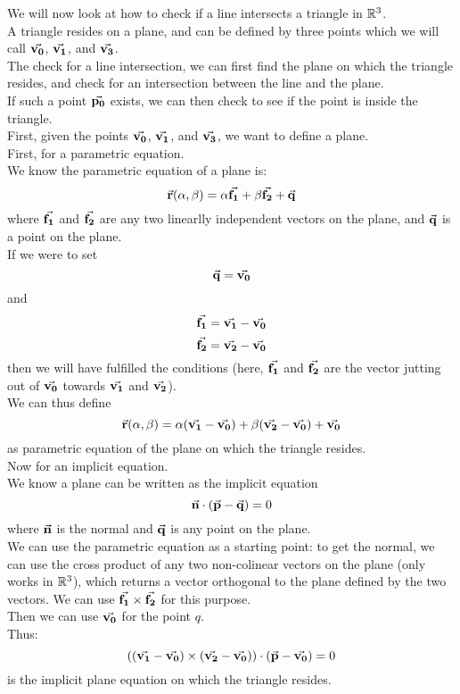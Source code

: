 \documentclass[12pt]{article}
\begin{document}
We will now look at how to check if a line
intersects a triangle in $\mathbb{R}^3$. \\

A triangle resides on a plane,
and can be defined by three points
which we will call $\vec{\mathbf{v_0}}$, $\vec{\mathbf{v_1}}$,
and $\vec{\mathbf{v_3}}$. \\
The check for a line intersection,
we can first find the plane on which the triangle
resides,
and check for an intersection between the line
and the plane. \\
If such a point $\vec{\mathbf{p_0}}$ exists,
we can then check to see if the point is
inside the triangle. \\

First, given the points $\vec{\mathbf{v_0}}$, $\vec{\mathbf{v_1}}$,
and $\vec{\mathbf{v_3}}$,
we want to define a plane. \\

First, for a parametric equation. \\
We know the parametric equation of a plane is:
\[ \vec{\mathbf{r}}(\alpha, \beta) 
= \alpha \vec{\mathbf{f_1}} + \beta \vec{\mathbf{f_2}} + \vec{\mathbf{q}} \]
where $\vec{\mathbf{f_1}}$ and $\vec{\mathbf{f_2}}$
are any two linearlly independent vectors
on the plane,
and $\vec{\mathbf{q}}$ is a point on the plane. \\
If we were to set
\[ \vec{\mathbf{q}} = \vec{\mathbf{v_0}} \] 
and 
\[ \vec{\mathbf{f_1}} = \vec{\mathbf{v_1}} - \vec{\mathbf{v_0}}   \]
\[ \vec{\mathbf{f_2}} = \vec{\mathbf{v_2}} - \vec{\mathbf{v_0}}   \]
then we will have fulfilled the conditions
(here, $\vec{\mathbf{f_1}}$ and $\vec{\mathbf{f_2}}$ 
are the vector jutting out of $\vec{\mathbf{v_0}}$
towards $\vec{\mathbf{v_1}}$ and $\vec{\mathbf{v_2}}$). \\
We can thus define
\[ \vec{\mathbf{r}}(\alpha, \beta) 
= \alpha (\vec{\mathbf{v_1}} - \vec{\mathbf{v_0}})
+ \beta (\vec{\mathbf{v_2}} - \vec{\mathbf{v_0}}) + \vec{\mathbf{v_0}} \]
as parametric equation of the plane
on which the triangle resides. \\

Now for an implicit equation. \\
We know a plane can be written as the implicit
equation 
\[ \vec{\mathbf{n}} \cdot (\vec{\mathbf{p}} - \vec{\mathbf{q}}) = 0 \]
where $\vec{\mathbf{n}}$ is the normal
and $\vec{\mathbf{q}}$ is any point on the plane. \\
We can use the parametric equation as a starting
point:
to get the normal, we can use the cross
product of any two non-colinear vectors
on the plane (only works in $\mathbb{R}^3$),
which returns a vector orthogonal to the plane
defined by the two vectors.
We can use $\vec{\mathbf{f_1}} \times \vec{\mathbf{f_2}}$
for this purpose. \\
Then we can use $\vec{\mathbf{v_0}}$ for the point $q$. \\
Thus:
\[ ((\vec{\mathbf{v_1}} - \vec{\mathbf{v_0}}) \times (\vec{\mathbf{v_2}} - \vec{\mathbf{v_0}}))
\cdot (\vec{\mathbf{p}} - \vec{\mathbf{v_0}}) = 0 \]
is the implicit plane equation on which the
triangle resides. \\
\end{document}

